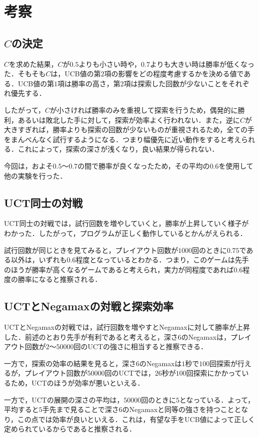 \documentclass{jarticle}
\begin{document}
\section{考察}
\subsection{$C$の決定}
$C$を求めた結果，$C$が$0.5$よりも小さい時や，$0.7$よりも大きい時は勝率が低くなった．そもそも$C$は，UCB値の第$2$項の影響をどの程度考慮するかを決める値である．UCB値の第$1$項は勝率の高さ，第$2$項は探索した回数が少ないことをそれぞれ優先する．

したがって，$C$が小さければ勝率のみを重視して探索を行うため，偶発的に勝利，あるいは敗北した手に対して，探索が効率よく行われない．また，逆に$C$が大きすぎれば，勝率よりも探索の回数が少ないものが重視されるため，全ての手をまんべんなく試行するようになる．つまり幅優先に近い動作をすると考えられる．これによって，探索の深さが浅くなり，良い結果が得られない．

今回は，およそ$0.5$〜$0.7$の間で勝率が良くなったため，その平均の$0.6$を使用して他の実験を行った．



\subsection{UCT同士の対戦}
UCT同士の対戦では，試行回数を増やしていくと，勝率が上昇していく様子がわかった．したがって，プログラムが正しく動作しているとかんがえられる．

試行回数が同じときを見てみると，プレイアウト回数が$1000$回のときに$0.75$である以外は，いずれも$0.6$程度となっているとわかる．つまり，このゲームは先手のほうが勝率が高くなるゲームであると考えられ，実力が同程度であれば$0.6$程度の勝率になると推察される．


\subsection{UCTとNegamaxの対戦と探索効率}
UCTとNegamaxの対戦では，試行回数を増やすとNegamaxに対して勝率が上昇した．前述のとおり先手が有利であると考えると，深さ$6$のNegamaxは，プレイアウト回数が$2〜50000$回のUCTの強さに相当すると推察できる．

一方で，探索の効率の結果を見ると，深さ$6$のNegamaxは$1$秒で$100$回探索が行えるが，プレイアウト回数が$50000$回のUCTでは，$26$秒が$100$回探索にかかっているため，UCTのほうが効率が悪いといえる．

一方で，UCTの展開の深さの平均は，$50000$回のときに$5$となっている．よって，平均すると$5$手先まで見ることで深さ$6$のNegamaxと同等の強さを持つこととなり，この点では効率が良いといえる．これは，有望な手をUCB値によって正しく定められているからであると推察される．
\end{document}
